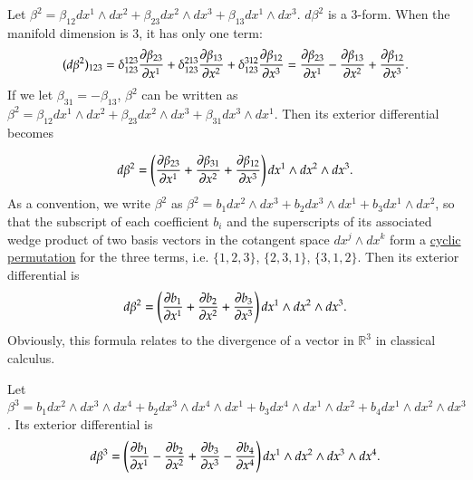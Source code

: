 \documentclass[11pt, a4paper]{book}
\begin{document}
\begin{Example}
  \label{exam:exterior-diff-2-form-3d}
  Let
  $\beta^2 = \beta_{12} dx^1 \wedge dx^2 + \beta_{23} dx^2 \wedge dx^3 + \beta_{13} dx^1
  \wedge dx^3$. $d\beta^2$ is a 3-form. When the manifold dimension is 3, it has only one
  term:
  \begin{equation}
    (d\beta^2)_{123} = \delta_{123}^{123} \frac{\partial \beta_{23}}{\partial x^1} +
    \delta_{123}^{213} \frac{\partial \beta_{13}}{\partial x^2} + \delta_{123}^{312}
    \frac{\partial \beta_{12}}{\partial x^3} = \frac{\partial \beta_{23}}{\partial x^1} -
    \frac{\partial \beta_{13}}{\partial x^2} + \frac{\partial \beta_{12}}{\partial x^3}.
  \end{equation}
  If we let $\beta_{31} = -\beta_{13}$, $\beta^2$ can be written as
  $\beta^2 = \beta_{12} dx^1 \wedge dx^2 + \beta_{23} dx^2 \wedge dx^3 + \beta_{31} dx^3
  \wedge dx^1$. Then its exterior differential becomes

  \begin{equation}
    d\beta^2 = \left( \frac{\partial \beta_{23}}{\partial x^1} + \frac{\partial \beta_{31}}{\partial
        x^2} + \frac{\partial \beta_{12}}{\partial x^3} \right) dx^1 \wedge dx^2 \wedge dx^3.
  \end{equation}
  As a convention, we write $\beta^2$ as
  $\beta^2 = b_1 dx^2 \wedge dx^3 + b_2 dx^3 \wedge dx^1 + b_3 dx^1 \wedge dx^2$, so that
  the subscript of each coefficient $b_i$ and the superscripts of its associated wedge
  product of two basis vectors in the cotangent space $dx^j \wedge dx^k$ form a
  \href{https://en.wikipedia.org/wiki/Cyclic_permutation}{cyclic permutation} for the
  three terms, i.e. $\{1,2,3\}$, $\{2,3,1\}$, $\{3,1,2\}$. Then its exterior differential
  is
  \begin{equation}
    \label{eq:exterior-diff-2-form-3d}
    d\beta^2 = \left( \frac{\partial b_1}{\partial x^{1}} + \frac{\partial b_2}{\partial x^2} +
      \frac{\partial b_3}{\partial x^3} \right) dx^1 \wedge dx^2 \wedge dx^3.
  \end{equation}
  Obviously, this formula relates to the divergence of a vector in $\mathbb{R}^3$ in
  classical calculus.
\end{Example}

\begin{Example}
  \label{exam:exterior-diff-3-form-4d}
  Let $\beta^3 = b_1 dx^2 \wedge dx^3 \wedge dx^4 + b_2 dx^3 \wedge dx^4 \wedge dx^1 + b_3
  dx^4 \wedge dx^1 \wedge dx^2 + b_4 dx^1 \wedge dx^2 \wedge dx^3$. Its exterior
  differential is
  \begin{equation}
    d\beta^3 = \left( \frac{\partial b_1}{\partial x^1} - \frac{\partial b_2}{\partial x^2} +
      \frac{\partial b_3}{\partial x^3} - \frac{\partial b_4}{\partial x^4} \right) dx^1 \wedge dx^2
    \wedge dx^3 \wedge dx^4.
  \end{equation}
\end{Example}
\end{document}
